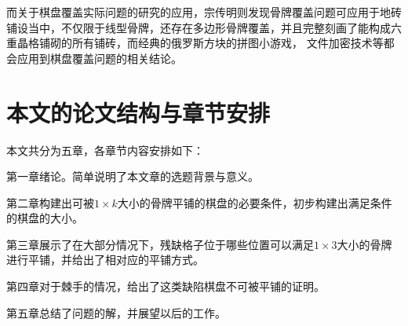 而关于棋盘覆盖实际问题的研究的应用，宗传明则发现骨牌覆盖问题可应用于地砖铺设当中，不仅限于线型骨牌，还存在多边形骨牌覆盖，并且完整刻画了能构成六重晶格铺砌的所有铺砖，而经典的俄罗斯方块的拼图小游戏，
文件加密技术等都会应用到棋盘覆盖问题的相关结论。
\section{本文的论文结构与章节安排}

\label{sec:arrangement}

本文共分为五章，各章节内容安排如下：

第一章绪论。简单说明了本文章的选题背景与意义。

第二章构建出可被$1 \times k$大小的骨牌平铺的棋盘的必要条件，初步构建出满足条件的棋盘的大小。

第三章展示了在大部分情况下，残缺格子位于哪些位置可以满足$1 \times 3$大小的骨牌进行平铺，并给出了相对应的平铺方式。

第四章对于棘手的情况，给出了这类缺陷棋盘不可被平铺的证明。

第五章总结了问题的解，并展望以后的工作。

